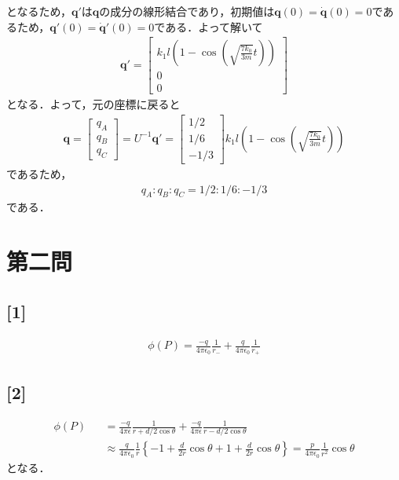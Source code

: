 \documentclass[12pt,dvipdfmx]{jsarticle}
\begin{document}
となるため，$\bm{q}'$は$\bm{q}$の成分の線形結合であり，初期値は$\bm{q}(0)=\dot{\bm{q}}(0)=0$であるため，$\bm{q}'(0)=\dot{\bm{q}}'(0)=0$である．よって解いて
\begin{eqnarray}
  \bm{q}'=
  \begin{bmatrix}
    k_1l\left( 1-\cos\left( \sqrt{\frac{7k_0}{3m}}t \right) \right)\\
    0\\
    0
  \end{bmatrix}
\end{eqnarray}
となる．よって，元の座標に戻ると
\begin{eqnarray}
  \bm{q} =
  \begin{bmatrix}
    q_A \\
    q_B \\
    q_C
  \end{bmatrix}
  =U^{-1} \bm{q}'=
  \begin{bmatrix}
    1/2\\
    1/6\\
    -1/3
  \end{bmatrix}
  k_1l\left( 1-\cos\left( \sqrt{\frac{7k_0}{3m}}t \right) \right)
\end{eqnarray}
であるため，
\begin{eqnarray}
  q_A:q_B:q_C = 1/2:1/6:-1/3
\end{eqnarray}
である．
\newpage
\section*{\Large{第二問}}

\subsection*{\large{[1]}}
\begin{eqnarray}
  \phi(P) = \frac{-q}{4\pi\epsilon_0}\frac{1}{r_-} + \frac{q}{4\pi\epsilon_0}\frac{1}{r_+}
\end{eqnarray}
\subsection*{\large{[2]}}
\begin{eqnarray}
  \phi(P)&&= \frac{-q}{4\pi\epsilon}\frac{1}{r+d/2\cos\theta} + \frac{-q}{4\pi\epsilon}\frac{1}{r-d/2\cos\theta} \\
  &&\approx \frac{q}{4\pi\epsilon_0}\frac{1}{r}\left\{ -1 + \frac{d}{2r}\cos\theta + 1 + \frac{d}{2r}\cos\theta \right\} = \frac{p}{4\pi\epsilon_0}\frac{1}{r^2}\cos\theta
\end{eqnarray}
となる．
\end{document}

